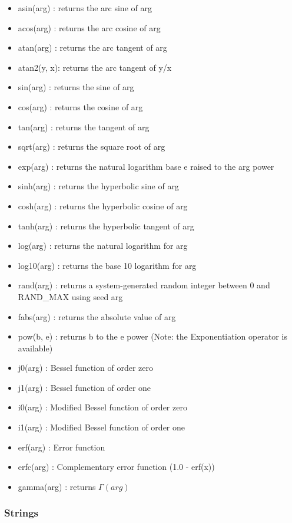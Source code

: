 \begin{itemize}
  \item asin(arg)  : returns the arc sine of arg
  \item acos(arg)  : returns the arc cosine of arg
  \item atan(arg)  : returns the arc tangent of arg
  \item atan2(y, x): returns the arc tangent of y/x
  \item sin(arg)   : returns the sine of arg
  \item cos(arg)   : returns the cosine of arg
  \item tan(arg)   : returns the tangent of arg
  \item sqrt(arg)  : returns the square root of arg
  \item exp(arg)   : returns the natural logarithm base e raised to the arg 
                     power
  \item sinh(arg)  : returns the hyperbolic sine of arg
  \item cosh(arg)  : returns the hyperbolic cosine of arg
  \item tanh(arg)  : returns the hyperbolic tangent of arg
  \item log(arg)   : returns the natural logarithm for arg
  \item log10(arg) : returns the base 10 logarithm for arg
  \item rand(arg)  : returns a system-generated random integer between 0 and RAND\_MAX using seed arg
  \item fabs(arg)  : returns the absolute value of arg
  \item pow(b, e)  : returns b to the e power 
                     (Note: the Exponentiation operator is available)
  \item j0(arg)    : Bessel function of order zero
  \item j1(arg)    : Bessel function of order one
  \item i0(arg)    : Modified Bessel function of order zero
  \item i1(arg)    : Modified Bessel function of order one
  \item erf(arg)   : Error function 
  \item erfc(arg)  : Complementary error function  (1.0 - erf(x))
  \item gamma(arg)  : returns $\Gamma(arg)$
\end{itemize}

\subsubsection{Strings}

